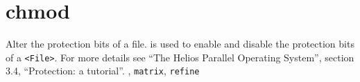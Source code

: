 \section{chmod}
\begin{man}
  \PP Alter the protection bits of a file.
   is used to enable and disable the protection bits of a
             {\tt <File>}. For more details see ``The Helios Parallel Operating
             System'', section 3.4, ``Protection: a tutorial''.
  , {\tt matrix}, {\tt refine}
\end{man}
